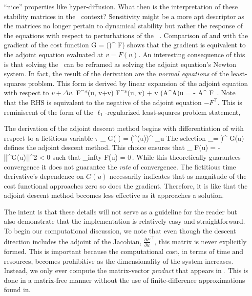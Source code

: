 ``nice'' properties like hyper-diffusion.
What then is the interpretation of these stability matrices in the \spt\ context?
Sensitivity might be a more apt descriptor as the matrices
no longer pertain to dynamical stability but rather the response of the equations
with respect to perturbations of the \spt\ \Fcs. Comparison of  and
 with the gradient of the cost function
\beq
\nabla G = ()^{\top} F)
\eeq
shows that the gradient is equivalent to the adjoint equation evaluated
at $v = F(u)$.
An interesting consequence
of this is that solving the \KSe\ can be reframed as solving the adjoint equation's Newton system.
In fact, the result of the derivation are the \textit{normal equations} of the least-squares
problem. This form is derived by linear expansion
of the adjoint equation with respect to $v + \Delta v$.
\beq
F^{*}(u, v+\Delta v) \approx F^*(u, v) +  \Delta v
\eeq
\beq
(A^{\top}A)\Delta u = - A^{\top} F \,.
\eeq
Note that the RHS is equivalent to the negative of the adjoint equation $-F^{\top}$.
This is reminiscent of the form of the $\ell_1$-regularized least-squares problem statement,


The derivation of the adjoint descent method begins with differentiation of 
with respect to a fictitious variable $\tau$
\beq
\partial_{\tau} G(  ) = (^{\top}(u))^{\top} \partial_{\tau}u
\label{e-adjointflow}
\eeq
The selection
\beq \label{e-descentdirection}
\partial_{\tau}=-)^{\top} G(u)
\eeq
defines the adjoint descent method. This choice ensures that
\beq \label{e-adjointdescent}
\partial_{\tau} F(u) = -||^{\top}G(u)||^2 < 0
\eeq
such that
\beq \label{e-costfuncationallimit}
\lim_{\tau \to infty} F(u) = 0\,.
\eeq
While this theoretically guarantees convergence it does not guarantee the \textit{rate} of
convergence. The fictitious time derivative's dependence on $G(u)$ necessarily
indicates that as magnitude of the cost functional approaches zero so does the gradient.
Therefore, it is like that the adjoint descent method becomes less effective as it approaches a solution.

The intent is that these details will not serve as a guideline
for the reader but also demonstrate that the implementation is relatively easy and
straightforward. To begin our computational discussion, we note that even though
the descent direction includes the adjoint of the Jacobian, $\frac{\partial F}{\partial u}^{\top}$, this
matrix is never explicitly formed. This is important because the computational
cost, in terms of time and resources, becomes prohibitive as the dimensionality of
the system increases. Instead, we only ever compute the matrix-vector \textit{product}
that appears in . This is done in a matrix-free manner without
the use of finite-difference approximations found in.

